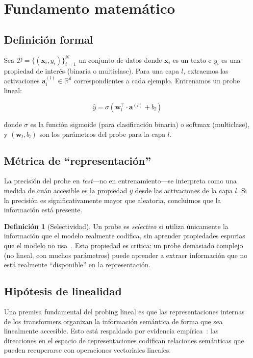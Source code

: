 \documentclass[11pt,a4paper]{report}
\theoremstyle{definition}
\newtheorem{definicion}{Definición}[chapter]
\begin{document}
\section{Fundamento matemático}

\subsection{Definición formal}

Sea $\mathcal{D} = \{(\mathbf{x}_i, y_i)\}_{i=1}^N$ un conjunto de datos donde $\mathbf{x}_i$ es un texto e $y_i$ es una propiedad de interés (binaria o multiclase). Para una capa $l$, extraemos las activaciones $\mathbf{a}^{(l)}_i \in \mathbb{R}^d$ correspondientes a cada ejemplo. Entrenamos un probe lineal:

\[
\hat{y} = \sigma(\mathbf{w}_l^\top \cdot \mathbf{a}^{(l)} + b_l)
\]

donde $\sigma$ es la función sigmoide (para clasificación binaria) o softmax (multiclase), y $(\mathbf{w}_l, b_l)$ son los parámetros del probe para la capa $l$.

\subsection{Métrica de ``representación''}

La precisión del probe en \emph{test}---no en entrenamiento---se interpreta como una medida de cuán accesible es la propiedad $y$ desde las activaciones de la capa $l$. Si la precisión es significativamente mayor que aleatoria, concluimos que la información está presente.

\begin{definicion}[Selectividad]
Un probe es \emph{selectivo} si utiliza únicamente la información que el modelo realmente codifica, sin aprender propiedades espurias que el modelo no usa~\cite{hewitt2019selectivity}. Esta propiedad es crítica: un probe demasiado complejo (no lineal, con muchos parámetros) puede aprender a extraer información que no está realmente ``disponible'' en la representación.
\end{definicion}

\subsection{Hipótesis de linealidad}

Una premisa fundamental del probing lineal es que las representaciones internas de los transformers organizan la información semántica de forma que sea linealmente accesible. Esto está respaldado por evidencia empírica~\cite{mikolov2013wordvec}: las direcciones en el espacio de representaciones codifican relaciones semánticas que pueden recuperarse con operaciones vectoriales lineales.
\end{document}
